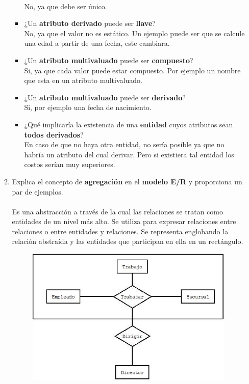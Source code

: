 \documentclass{article}
\begin{document}
\begin{enumerate}
\begin{enumerate}
\begin{itemize}
					\\No, ya que debe ser único.
					\item ¿Un \textbf{atributo derivado} puede ser \textbf{llave}? 
					\\No, ya que el valor no es estático. Un ejemplo puede ser que se calcule una edad a partir de una fecha, este cambiara. 
					\item ¿Un \textbf{atributo multivaluado} puede ser \textbf{compuesto}? 
					\\Si, ya que cada valor puede estar compuesto. Por ejemplo un nombre que esta en un atributo multivaluado.
					\item ¿Un \textbf{atributo multivaluado} puede ser \textbf{derivado}? 
					\\Si, por ejemplo una fecha de nacimiento.
					\item ¿Qué implicaría la existencia de una \textbf{entidad} cuyos atributos sean \textbf{todos derivados}?				
					\\En caso de que no haya otra entidad, no sería posible ya que no habría un atributo del cual derivar. Pero si existiera tal entidad los costos serían muy superiores.\\
				\end{itemize}
				\item Explica el concepto de \textbf{agregación} en el \textbf{modelo E/R} y proporciona un par de ejemplos.
				\\\\Es una abstracción a través de la cual las relaciones se tratan como entidades de un nivel más alto. Se utiliza para expresar relaciones entre relaciones o entre entidades y relaciones. Se representa englobando la relación abstraída y las entidades que participan en ella en un rectángulo.\\
					\begin{figure}[H]
					\centering
					\includegraphics[width=1\textwidth]{imagenes/Agregacion1}

\end{figure}
\end{enumerate}
\end{enumerate}
\end{document}
